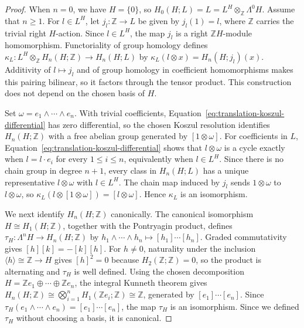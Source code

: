 \documentclass[pdflatex,sn-mathphys-num]{sn-jnl}%
\theoremstyle{plain}
\theoremstyle{remark}
\theoremstyle{definition}
\numberwithin{equation}{section}
\begin{document}
\begin{proof}
When \( n=0 \), we have \( H=\{0\} \), so \( H_0(H;L)=L=L^H\otimes_{\mathbb Z}\Lambda^0H \). Assume that \( n\geq1 \). For \( l\in L^H \), let \( j_l\colon\mathbb Z\to L \) be given by \( j_l(1)=l \), where \( \mathbb Z \) carries the trivial right \( H \)-action. Since \( l\in L^H \), the map \( j_l \) is a right \( \mathbb ZH \)-module homomorphism. Functoriality of group homology defines \( \kappa_L\colon L^H\otimes_{\mathbb Z}H_n(H;\mathbb Z)\to H_n(H;L) \) by \( \kappa_L(l\otimes x)=H_n(H;j_l)(x) \). Additivity of \( l\mapsto j_l \) and of group homology in coefficient homomorphisms makes this pairing bilinear, so it factors through the tensor product. This construction does not depend on the chosen basis of \( H \).

Set \( \omega=e_1\wedge\cdots\wedge e_n \). With trivial coefficients, Equation~\eqref{eq:translation-koszul-differential} has zero differential, so the chosen Koszul resolution identifies \( H_n(H;\mathbb Z) \) with a free abelian group generated by \( [1\otimes\omega] \). For coefficients in \( L \), Equation~\eqref{eq:translation-koszul-differential} shows that \( l\otimes\omega \) is a cycle exactly when \( l=l\cdot e_i \) for every \( 1\leq i\leq n \), equivalently when \( l\in L^H \). Since there is no chain group in degree \( n+1 \), every class in \( H_n(H;L) \) has a unique representative \( l\otimes\omega \) with \( l\in L^H \). The chain map induced by \( j_l \) sends \( 1\otimes\omega \) to \( l\otimes\omega \), so \( \kappa_L(l\otimes[1\otimes\omega])=[l\otimes\omega] \). Hence \( \kappa_L \) is an isomorphism.

We next identify \( H_n(H;\mathbb Z) \) canonically. The canonical isomorphism \( H\cong H_1(H;\mathbb Z) \), together with the Pontryagin product, defines \( \tau_H\colon\Lambda^nH\to H_n(H;\mathbb Z) \) by \( h_1\wedge\cdots\wedge h_n\mapsto [h_1]\cdots[h_n] \). Graded commutativity gives \( [h][k]=-[k][h] \). For \( h\neq0 \), naturality under the inclusion \( \langle h\rangle\cong\mathbb Z\to H \) gives \( [h]^2=0 \) because \( H_2(\mathbb Z;\mathbb Z)=0 \), so the product is alternating and \( \tau_H \) is well defined. Using the chosen decomposition \( H=\mathbb Ze_1\oplus\cdots\oplus\mathbb Ze_n \), the integral Kunneth theorem gives \( H_n(H;\mathbb Z)\cong\bigotimes_{i=1}^n H_1(\mathbb Ze_i;\mathbb Z)\cong\mathbb Z \), generated by \( [e_1]\cdots[e_n] \). Since \( \tau_H(e_1\wedge\cdots\wedge e_n)=[e_1]\cdots[e_n] \), the map \( \tau_H \) is an isomorphism. Since we defined \( \tau_H \) without choosing a basis, it is canonical.


\end{proof}
\end{document}
